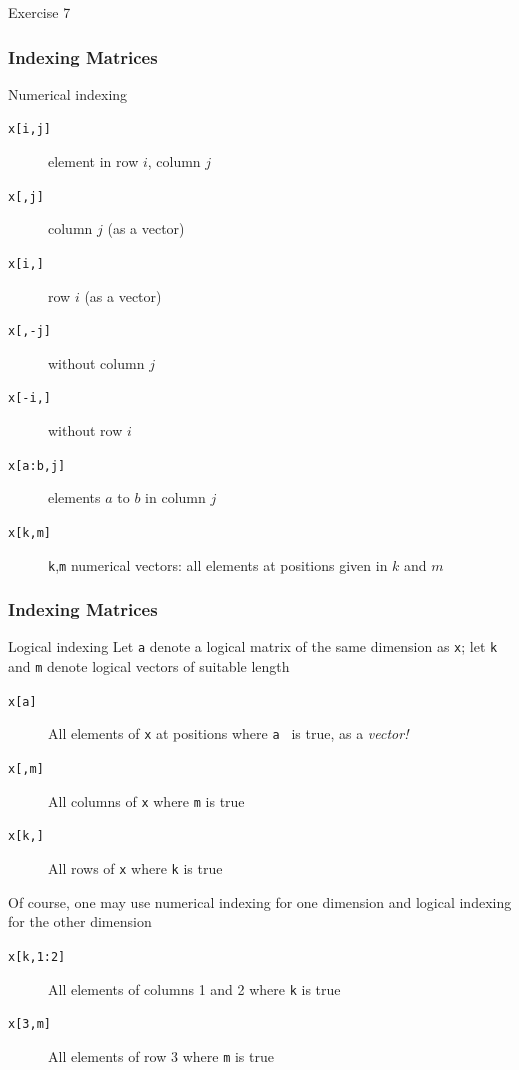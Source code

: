 \documentclass[xcolor={svgnames},10pt,
handout
]{beamer}
\begin{document}
\begin{frame}[standout]
Exercise 7
\end{frame}


\begin{frame}
\frametitle{Indexing Matrices}
Numerical indexing
\begin{description}
\item[{\texttt{x[i,j]}}] element in row $i$, column $j$
\item[{\texttt{x[,j]}}] column $j$ (as a vector)
\item[{\texttt{x[i,]}}] row $i$ (as a vector)
\item[{\texttt{x[,-j]}}] without column $j$
\item[{\texttt{x[-i,]}}] without row $i$
\item[{\texttt{x[a:b,j]}}] elements $a$ to $b$ in column $j$
\item[{\texttt{x[k,m]}}] \texttt{k},\texttt{m} numerical vectors: all
elements at positions \newline
given in $k$ and $m$
\end{description}
\end{frame}


\begin{frame}
\frametitle{Indexing Matrices}
Logical indexing
Let \texttt{a} denote a logical matrix of the same dimension as \texttt{x}; 
\newline
let \texttt{k} and \texttt{m} denote logical vectors of suitable length
\begin{description}
\item[{\texttt{x[a]}}] All elements of \texttt{x} at positions where \texttt{a%
} is true, \newline
as a \emph{vector!}
\item[{\texttt{x[,m]}}] All columns of \texttt{x} where \texttt{m} is true
\item[{\texttt{x[k,]}}] All rows of \texttt{x} where \texttt{k} is true
\end{description}
Of course, one may use numerical indexing for one dimension \newline
and logical indexing for the other dimension
\begin{description}
\item[{\texttt{x[k,1:2]}}] All elements of columns 1 and 2 where \texttt{k}
is true
\item[{\texttt{x[3,m]}}] All elements of row 3 where \texttt{m} is true
\end{description}
\end{frame}
\end{document}
